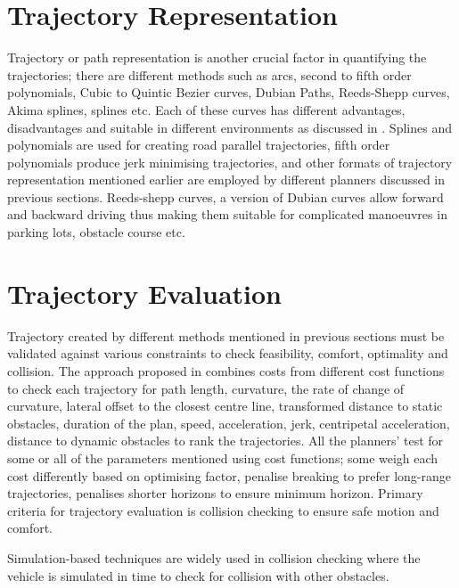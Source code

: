 \section{Trajectory Representation}
\label{trajrep}
Trajectory or path representation is another crucial factor in quantifying the trajectories; there are different methods such as arcs, second to fifth order polynomials, Cubic to Quintic Bezier curves, Dubian Paths, Reeds-Shepp curves, Akima splines, splines etc. Each of these curves has different advantages, disadvantages and suitable in different environments as discussed in \cite{motion_planning_techniques}. Splines and polynomials are used for creating road parallel trajectories, fifth order polynomials produce jerk minimising trajectories\cite{werling_frenet}, and other formats of trajectory representation mentioned earlier are employed by different planners discussed in previous sections. Reeds-shepp curves, a version of Dubian curves allow forward and backward driving \cite{reedsshepp} thus making them suitable for complicated manoeuvres in parking lots, obstacle course etc.


\section{Trajectory Evaluation}
\label{traj_eval}
Trajectory created by different methods mentioned in previous sections must be validated against various constraints to check feasibility, comfort, optimality and collision. The approach proposed in \cite{traj_planner_optimization} combines costs from different cost functions to check each trajectory for path length, curvature, the rate of change of curvature, lateral offset to the closest centre line, transformed distance to static obstacles, duration of the plan, speed, acceleration, jerk, centripetal acceleration, distance to dynamic obstacles to rank the trajectories. All the planners' test for some or all of the parameters mentioned using cost functions; some weigh each cost differently based on optimising factor, \cite{unit_A_star} penalise breaking to prefer long-range trajectories, \cite{cmu_parallel_thesis} penalises shorter horizons to ensure minimum horizon. Primary criteria for trajectory evaluation is collision checking to ensure safe motion and comfort.

Simulation-based techniques are widely used in collision checking where the vehicle is simulated in time to check for collision with other obstacles.

